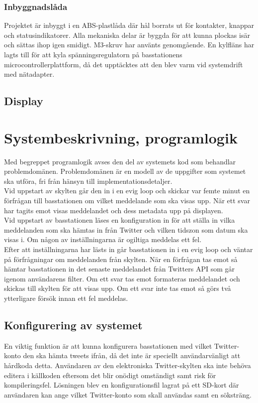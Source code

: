 \documentclass[a4paper,11pt]{article}
\begin{document}
\subsubsection{Inbyggnadslåda}
Projektet är inbyggt i en ABS-plastlåda där hål borrats ut för kontakter, knappar och statusindikatorer. Alla mekaniska delar är byggda för att kunna plockas isär och sättas ihop igen smidigt. M3-skruv har använts genomgående. En kylfläns har lagts till för att kyla spänningsregulatorn på basstationens microcontrollerplattform, då det upptäcktes att den blev varm vid systemdrift med nätadapter.

\subsection{Display}

\section{Systembeskrivning, programlogik}
Med begreppet programlogik avses den del av systemets kod som behandlar problemdomänen. Problemdomänen är en modell av de uppgifter som systemet ska utföra, fri från hänsyn till implementationsdetaljer. \\

Vid uppstart av skylten går den in i en evig loop och skickar var femte minut en förfrågan till basstationen om vilket meddelande som ska visas upp. När ett svar har tagits emot visas meddelandet och dess metadata upp på displayen. \\

Vid uppstart av basstationen läses en konfiguration in för att ställa in vilka meddelanden som ska hämtas in från Twitter och vilken tidszon som datum ska visas i. Om någon av inställningarna är ogiltiga meddelas ett fel. \\

Efter att inställningarna har lästs in går basstationen in i en evig loop och väntar på förfrågningar om meddelanden från skylten. När en förfrågan tas emot så hämtar basstationen in det senaste meddelandet från Twitters API som går igenom användarens filter. Om ett svar tas emot formateras meddelandet och skickas till skylten för att visas upp. Om ett svar inte tas emot så görs två ytterligare försök innan ett fel meddelas.

\subsection{Konfigurering av systemet}
En viktig funktion är att kunna konfigurera basstationen med vilket Twitter-konto den ska hämta tweets ifrån, då det inte är speciellt användarvänligt att hårdkoda detta. Användaren av den elektroniska Twitter-skylten ska inte behöva editera i källkoden eftersom det blir onödigt omständigt samt risk för kompileringsfel. Lösningen blev en konfigurationsfil lagrat på ett SD-kort där användaren kan ange vilket Twitter-konto som skall användas samt en söksträng. \\
\end{document}
